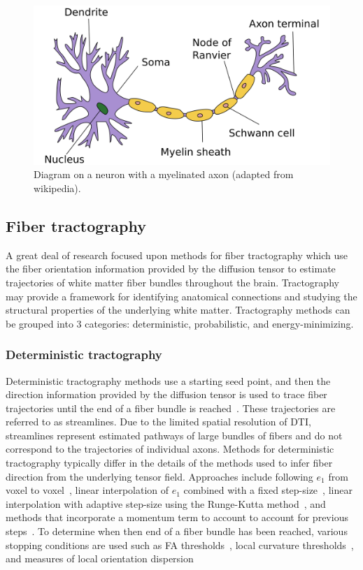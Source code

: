 \begin{figure}[ht]
\begin{center}
\includegraphics[width=0.75\linewidth]{figures/Neuron_Hand-tuned.png}
\caption{
\label{fig:neuron}
Diagram on a neuron with a myelinated axon (adapted from wikipedia).}
\end{center}
\end{figure}

\subsection{Fiber tractography}
A great deal of research focused upon methods for fiber tractography which use the fiber orientation information provided by the diffusion tensor to estimate trajectories of white matter fiber bundles throughout the brain. Tractography may provide a framework for identifying anatomical connections and studying the structural properties of the underlying white matter. Tractography methods can be grouped into 3 categories: deterministic, probabilistic, and energy-minimizing. 

\subsubsection{Deterministic tractography}
Deterministic tractography methods use a starting seed point, and then the direction information provided by the diffusion tensor is used to trace fiber trajectories until the end of a fiber bundle is reached~\cite{Basser2000,Mori99b}. These trajectories are referred to as streamlines. Due to the limited spatial resolution of DTI, streamlines represent estimated pathways of large bundles of fibers and do not correspond to the trajectories of individual axons. Methods for deterministic tractography typically differ in the details of the methods used to infer fiber direction from the underlying tensor field. Approaches include following $e_1$ from voxel to voxel~\cite{Mori1999}, linear interpolation of $e_1$ combined with a fixed step-size~\cite{Conturo1999}, linear interpolation with adaptive step-size using the Runge-Kutta method~\cite{Basser2000,Tench2002}, and methods that incorporate a momentum term to account to account for previous steps~\cite{Lazar2003}. To determine when then end of a fiber bundle has been reached, various stopping conditions are used such as FA thresholds~\cite{Conturo1999}, local curvature thresholds~\cite{Basser2000}, and measures of local orientation dispersion~\cite{Mori1999}

